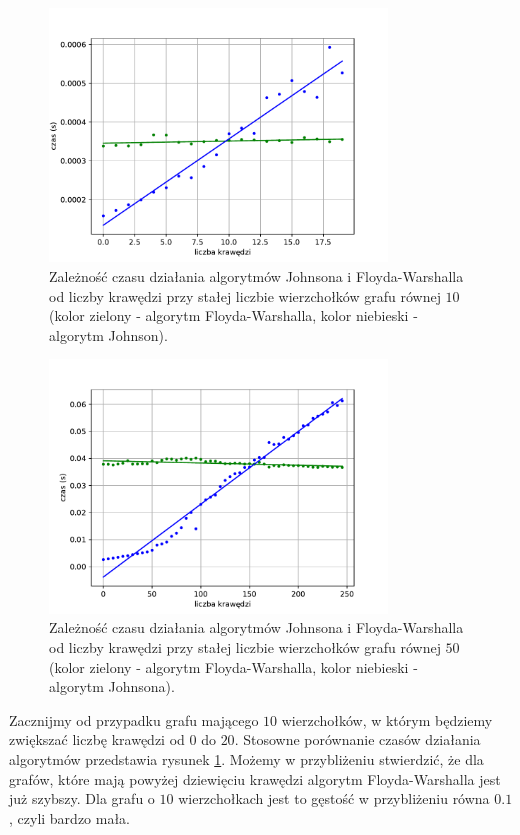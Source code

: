 \documentclass[12pt,a4paper]{book}
\theoremstyle{definition}
\numberwithin{equation}{chapter}
\begin{document}
\begin{figure}[H]
\centering
\includegraphics[width=0.8\textwidth]{images/Wykres_granica_gestego_grafu_10_wierzcholkow.pdf}
\caption{Zależność czasu działania algorytmów Johnsona i Floyda-Warshalla od liczby krawędzi przy stałej liczbie wierzchołków grafu równej $10$ (kolor zielony - algorytm Floyda-Warshalla, kolor niebieski - algorytm Johnson).}
\label{rys_wykres_gran_gest_10}
\end{figure}

\begin{figure}[H]
\centering
\includegraphics[width=0.8\textwidth]{images/Wykres_granica_gestego_grafu_50_wierzcholkow.pdf}
\caption{Zależność czasu działania algorytmów Johnsona i Floyda-Warshalla od liczby krawędzi przy stałej liczbie wierzchołków grafu równej $50$ (kolor zielony - algorytm Floyda-Warshalla, kolor niebieski - algorytm Johnsona).}
\label{rys_wykres_gran_gest_50}
\end{figure}

Zacznijmy od przypadku grafu mającego $10$ wierzchołków, w którym będziemy zwiększać liczbę krawędzi od $0$ do $20$. Stosowne porównanie czasów działania algorytmów przedstawia rysunek \ref{rys_wykres_gran_gest_10}. Możemy w przybliżeniu stwierdzić, że dla grafów, które mają powyżej dziewięciu krawędzi algorytm Floyda-Warshalla jest już szybszy. Dla grafu o $10$ wierzchołkach jest to gęstość w przybliżeniu równa  $0.1$, czyli bardzo mała. 
\end{document}
